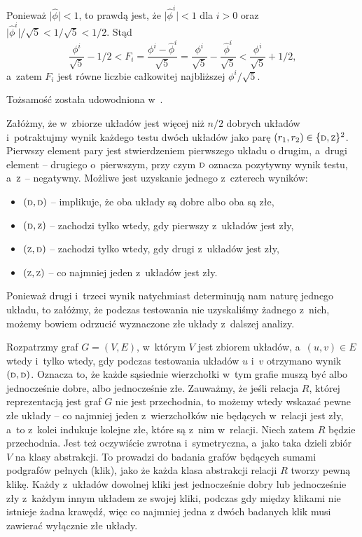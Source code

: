 \subproblem %
Ponieważ $\bigl|\widehat\phi\bigr|<1$, to prawdą jest, że $\bigl|\widehat\phi^i\bigr|<1$ dla $i>0$ oraz $\bigl|\widehat\phi^i\bigr|/\sqrt{5}<1/\sqrt{5}<1/2$. Stąd
\[
	\frac{\phi^i}{\sqrt{5}}-1/2 < F_i = \frac{\phi^i-\widehat\phi^i}{\sqrt{5}} = \frac{\phi^i}{\sqrt{5}}-\frac{\widehat\phi^i}{\sqrt{5}} < \frac{\phi^i}{\sqrt{5}}+1/2,
\]
a~zatem $F_i$ jest równe liczbie całkowitej najbliższej $\phi^i/\sqrt{5}$.

\subproblem %
Tożsamość została udowodniona w~.


\subproblem %
Załóżmy, że w~zbiorze układów jest więcej niż $n/2$ dobrych układów i~potraktujmy wynik każdego testu dwóch układów jako parę $(r_1,r_2)\in\{{\scriptstyle\rm D},{\scriptstyle\rm Z}\}^2$. Pierwszy element pary jest stwierdzeniem pierwszego układu o drugim, a~drugi element -- drugiego o~pierwszym, przy czym ${\scriptstyle\rm D}$ oznacza pozytywny wynik testu, a~${\scriptstyle\rm Z}$ -- negatywny. Możliwe jest uzyskanie jednego z~czterech wyników:
\begin{itemize}
	\item $({\scriptstyle\rm D},{\scriptstyle\rm D})$ -- implikuje, że oba układy są dobre albo oba są złe,
	\item $({\scriptstyle\rm D},{\scriptstyle\rm Z})$ -- zachodzi tylko wtedy, gdy pierwszy z~układów jest zły,
	\item $({\scriptstyle\rm Z},{\scriptstyle\rm D})$ -- zachodzi tylko wtedy, gdy drugi z~układów jest zły,
	\item $({\scriptstyle\rm Z},{\scriptstyle\rm Z})$ -- co najmniej jeden z~układów jest zły.
\end{itemize}
Ponieważ drugi i~trzeci wynik natychmiast determinują nam naturę jednego układu, to załóżmy, że podczas testowania nie uzyskaliśmy żadnego z~nich, możemy bowiem odrzucić wyznaczone złe układy z~dalszej analizy.

Rozpatrzmy graf $G=(V,E)$, w~którym $V$ jest zbiorem układów, a~$(u,v)\in E$ wtedy i~tylko wtedy, gdy podczas testowania układów $u$ i~$v$ otrzymano wynik $({\scriptstyle\rm D},{\scriptstyle\rm D})$. Oznacza to, że każde sąsiednie wierzchołki w~tym grafie muszą być albo jednocześnie dobre, albo jednocześnie złe. Zauważmy, że jeśli relacja $R$, której reprezentacją jest graf $G$ nie jest przechodnia, to możemy wtedy wskazać pewne złe układy -- co najmniej jeden z~wierzchołków nie będących w~relacji jest zły, a~to z~kolei indukuje kolejne złe, które są z~nim w~relacji. Niech zatem $R$ będzie przechodnia. Jest też oczywiście zwrotna i~symetryczna, a~jako taka dzieli zbiór $V$ na klasy abstrakcji. To prowadzi do badania grafów będących sumami podgrafów pełnych (klik), jako że każda klasa abstrakcji relacji $R$ tworzy pewną klikę. Każdy z~układów dowolnej kliki jest jednocześnie dobry lub jednocześnie zły z~każdym innym układem ze swojej kliki, podczas gdy między klikami nie istnieje żadna krawędź, więc co najmniej jedna z dwóch badanych klik musi zawierać wyłącznie złe układy.

